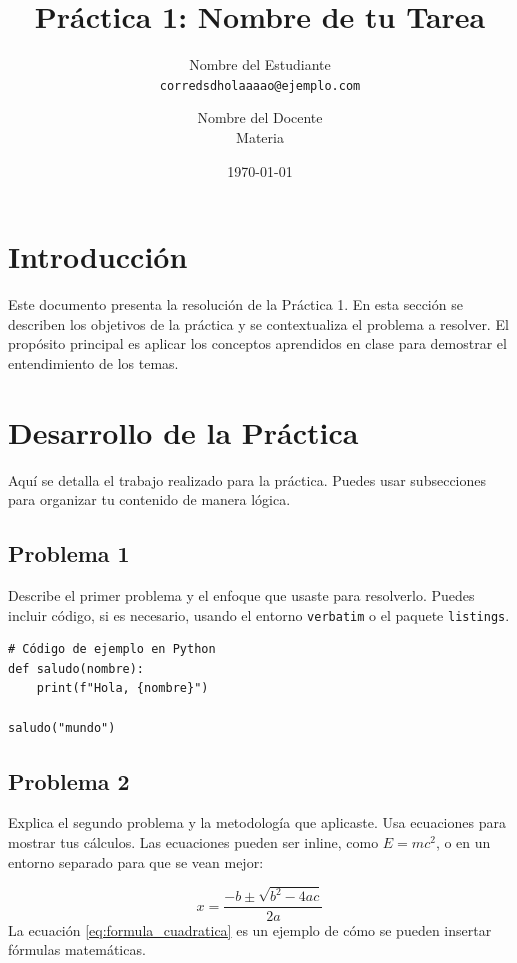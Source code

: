 \documentclass[12pt]{article}
\title{Práctica 1: Nombre de tu Tarea}
\author{
  Nombre del Estudiante \\
  \texttt{corredsdholaaaao@ejemplo.com}
  \and
  Nombre del Docente \\
  Materia
}
\date{\today}
\begin{document}
\maketitle
\thispagestyle{empty} %

\clearpage
{} %

\section{Introducción}
\label{sec:introduccion}
Este documento presenta la resolución de la Práctica 1. En esta sección se describen los objetivos de la práctica y se contextualiza el problema a resolver. El propósito principal es aplicar los conceptos aprendidos en clase para demostrar el entendimiento de los temas.

\section{Desarrollo de la Práctica}
\label{sec:desarrollo}
Aquí se detalla el trabajo realizado para la práctica. Puedes usar subsecciones para organizar tu contenido de manera lógica.

\subsection{Problema 1}
\label{subsec:problema1}
Describe el primer problema y el enfoque que usaste para resolverlo. Puedes incluir código, si es necesario, usando el entorno \texttt{verbatim} o el paquete \texttt{listings}.

\begin{verbatim}
# Código de ejemplo en Python
def saludo(nombre):
    print(f"Hola, {nombre}")

saludo("mundo")
\end{verbatim}

\subsection{Problema 2}
\label{subsec:problema2}
Explica el segundo problema y la metodología que aplicaste. Usa ecuaciones para mostrar tus cálculos. Las ecuaciones pueden ser inline, como $E=mc^2$, o en un entorno separado para que se vean mejor:

\begin{equation}
    x = \frac{-b \pm \sqrt{b^2 - 4ac}}{2a}
    \label{eq:formula_cuadratica}
\end{equation}
La ecuación \eqref{eq:formula_cuadratica} es un ejemplo de cómo se pueden insertar fórmulas matemáticas.
\end{document}
